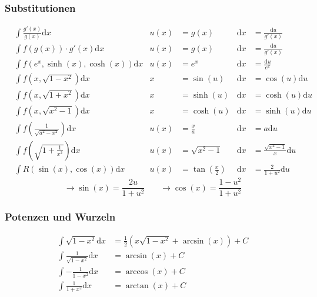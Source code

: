 \documentclass[a3paper, 11pt, landscape]{scrartcl}
\begin{document}
\begin{multicols*}{3}
				\subsubsection{Substitutionen}
					\label{sec:substitution}
					\vspace{-7pt}
					\begin{small}
						\begin{align*}
							&\int \frac{g'(x)}{g(x)}\text{d}x &u(x)&=g(x) &\text{d}x&=\frac{\text{d}u}{g'(x)}\\
							&\int f(g(x))\cdot g'(x)\text{d}x &u(x)&=g(x) &\text{d}x&=\frac{\text{d}u}{g'(x)}\\
							&\int f(e^x, \sinh(x), \cosh(x))\text{d}x &u(x)&=e^x &\text{d}x&=\frac{\text{d}u}{e^x}\\			
							&\int f(x, \sqrt{1-x^2})\text{d}x &x&=\sin(u) &\text{d}x&=\cos(u)\text{d}u\\
							&\int f(x, \sqrt{1+x^2})\text{d}x &x&=\sinh(u) &\text{d}x&=\cosh(u)\text{d}u\\
							&\int f(x, \sqrt{x^2-1})\text{d}x &x&=\cosh(u) &\text{d}x&=\sinh(u)\text{d}u\\
							&\int f\left(\frac{1}{\sqrt{a^2-x^2}}\right)\text{d}x &u(x)&=\frac{x}{a} &\text{d}x&=a\text{d}u\\
							&\int f\left(\sqrt{1+\frac{1}{x^2}}\right)\text{d}x &u(x)&=\sqrt{x^2-1} &\text{d}x&=\frac{\sqrt{x^2-1}}{x} \text{d}u\\
							&\int R(\sin(x), \cos(x))\text{d}x &u(x)&=\tan\left(\frac{x}{2}\right) &\text{d}x&=\frac{2}{1+u^2}\text{d}u
						\end{align*}
						\begin{equation*}
							\rightarrow \sin(x)=\frac{2u}{1+u^2} \hspace{22pt} \rightarrow \cos(x)=\frac{1-u^2}{1+u^2}
						\end{equation*}
					\end{small}
				\subsubsection{Potenzen und Wurzeln}
					\vspace{-7pt}
					\begin{align*}
						\int \sqrt{1-x^2}\text{d}x&= \frac{1}{2} \left(x\sqrt{1-x^2}+\arcsin(x)\right)+C\\
						\int \frac{1}{\sqrt{1-x^2}}\text{d}x&=\arcsin(x)+C\\
						\int -\frac{1}{1-x^2}\text{d}x&=\arccos(x)+C\\
						\int \frac{1}{1+x^2}\text{d}x&=\arctan(x)+C
					\end{align*}

\end{multicols*}
\end{document}
